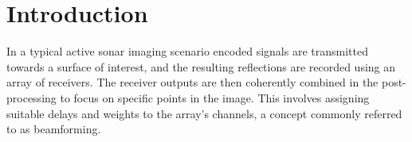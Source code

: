 \documentclass[12pt,journal,captionsoff,onecolumn]{IEEEtran}
\newcounter{todoidx}
\newlength\marginparwidthsmall
\newcommand\todo[1]{%
      \addtocounter{todoidx}{1}%
      {\color{Red}\fbox{\bf\thetodoidx{}}}%
      \marginpar{%
         {\vspace*{-10pt}\color{Red}\fbox{\bf\thetodoidx{}}}\\%
         \fcolorbox{red}{todobackground}{\parbox{\marginparwidthsmall}{\scriptsize #1}}}}
\newcommand\todo[1]{}
\newcommand\1{\vec 1}
\begin{document}
\newpage
\maketitle

\section{Introduction}

% 
% 

In a typical active sonar imaging scenario encoded signals are transmitted towards a surface of interest, and the resulting reflections are recorded using an array of receivers. The receiver outputs are then coherently combined in the post-processing to focus on specific points in the image. This involves assigning suitable delays and weights to the array's channels, a concept commonly referred to as beamforming.
\end{document}
